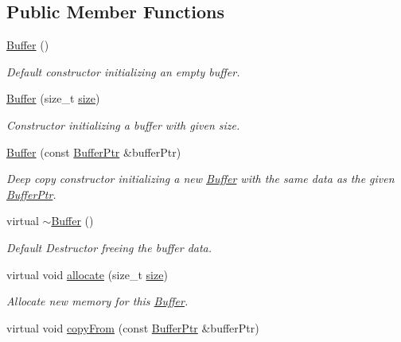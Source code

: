 \subsection*{Public Member Functions}
\begin{DoxyCompactItemize}
\item 
\hyperlink{class_gost_crypt_1_1_buffer_a1cac71b3c018c8f7a3a46be93408fa59}{Buffer} ()
\begin{DoxyCompactList}\small\item\em Default constructor initializing an empty buffer. \end{DoxyCompactList}\item 
\hyperlink{class_gost_crypt_1_1_buffer_a09ac1c3d1436782956d90f98265a3ae3}{Buffer} (size\+\_\+t \hyperlink{class_gost_crypt_1_1_buffer_a5324726029e7f906f2f14e54eeb1ab82}{size})
\begin{DoxyCompactList}\small\item\em Constructor initializing a buffer with given size. \end{DoxyCompactList}\item 
\hyperlink{class_gost_crypt_1_1_buffer_a079e8e1baffbf5912dbc161b7b58538c}{Buffer} (const \hyperlink{class_gost_crypt_1_1_buffer_ptr}{Buffer\+Ptr} \&buffer\+Ptr)
\begin{DoxyCompactList}\small\item\em Deep copy constructor initializing a new \hyperlink{class_gost_crypt_1_1_buffer}{Buffer} with the same data as the given \hyperlink{class_gost_crypt_1_1_buffer_ptr}{Buffer\+Ptr}. \end{DoxyCompactList}\item 
virtual \hyperlink{class_gost_crypt_1_1_buffer_acd67d77c45dc6419bc42de6b5ed86fee}{$\sim$\+Buffer} ()
\begin{DoxyCompactList}\small\item\em Default Destructor freeing the buffer data. \end{DoxyCompactList}\item 
virtual void \hyperlink{class_gost_crypt_1_1_buffer_ab5176ad1ed87433b479f8ccb96b84855}{allocate} (size\+\_\+t \hyperlink{class_gost_crypt_1_1_buffer_a5324726029e7f906f2f14e54eeb1ab82}{size})
\begin{DoxyCompactList}\small\item\em Allocate new memory for this \hyperlink{class_gost_crypt_1_1_buffer}{Buffer}. \end{DoxyCompactList}\item 
virtual void \hyperlink{class_gost_crypt_1_1_buffer_aebc942f433bb27ef5712a59631ed0137}{copy\+From} (const \hyperlink{class_gost_crypt_1_1_buffer_ptr}{Buffer\+Ptr} \&buffer\+Ptr)

\end{DoxyCompactItemize}
